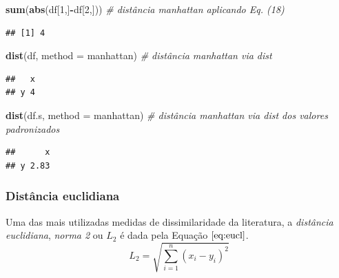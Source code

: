 \documentclass[
]{book}
\newenvironment{Shaded}{\begin{snugshade}}{\end{snugshade}}
\newcommand{\CommentTok}[1]{\textcolor[rgb]{0.56,0.35,0.01}{\textit{#1}}}
\newcommand{\DataTypeTok}[1]{\textcolor[rgb]{0.13,0.29,0.53}{#1}}
\newcommand{\DecValTok}[1]{\textcolor[rgb]{0.00,0.00,0.81}{#1}}
\newcommand{\KeywordTok}[1]{\textcolor[rgb]{0.13,0.29,0.53}{\textbf{#1}}}
\newcommand{\NormalTok}[1]{#1}
\newcommand{\OperatorTok}[1]{\textcolor[rgb]{0.81,0.36,0.00}{\textbf{#1}}}
\newcommand{\StringTok}[1]{\textcolor[rgb]{0.31,0.60,0.02}{#1}}
\theoremstyle{definition}
\theoremstyle{definition}
\theoremstyle{definition}
\theoremstyle{remark}
\begin{document}
\begin{Shaded}
\begin{Highlighting}[]
\KeywordTok{sum}\NormalTok{(}\KeywordTok{abs}\NormalTok{(df[}\DecValTok{1}\NormalTok{,]}\OperatorTok{{-}}\NormalTok{df[}\DecValTok{2}\NormalTok{,]))  }\CommentTok{\# distância manhattan aplicando Eq. (18)}
\end{Highlighting}
\end{Shaded}

\begin{verbatim}
## [1] 4
\end{verbatim}

\begin{Shaded}
\begin{Highlighting}[]
\KeywordTok{dist}\NormalTok{(df, }\DataTypeTok{method =} \StringTok{\textquotesingle{}manhattan\textquotesingle{}}\NormalTok{)  }\CommentTok{\# distância manhattan via \textquotesingle{}dist\textquotesingle{}}
\end{Highlighting}
\end{Shaded}

\begin{verbatim}
##   x
## y 4
\end{verbatim}

\begin{Shaded}
\begin{Highlighting}[]
\KeywordTok{dist}\NormalTok{(df.s, }\DataTypeTok{method =} \StringTok{\textquotesingle{}manhattan\textquotesingle{}}\NormalTok{)  }\CommentTok{\# distância manhattan via \textquotesingle{}dist\textquotesingle{} dos valores padronizados}
\end{Highlighting}
\end{Shaded}

\begin{verbatim}
##      x
## y 2.83
\end{verbatim}

\hypertarget{distuxe2ncia-euclidiana}{%
\subsubsection*{Distância euclidiana}\label{distuxe2ncia-euclidiana}}

Uma das mais utilizadas medidas de dissimilaridade da literatura, a \emph{distância euclidiana}, \emph{norma 2} ou \(L_2\) é dada pela Equação \(\eqref{eq:eucl}\).
\begin{equation}
L_2 = \sqrt{\sum_{i=1}^{n} (x_i - y_i)^2}
\label{eq:eucl}
\end{equation}
\end{document}
